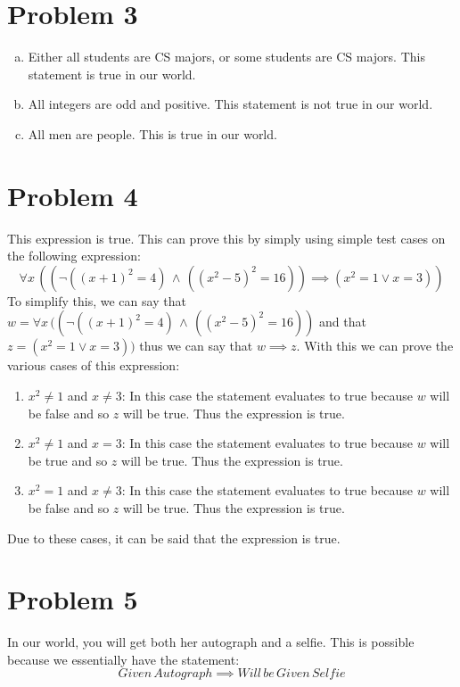 \documentclass[12pt]{article}%
\begin{document}
\section*{Problem 3}
    \begin{enumerate}[a)]
        \item Either all students are CS majors, or some students are CS majors. This statement is true in our world.
        \item All integers are odd and positive. This statement is not true in our world.
        \item All men are people. This is true in our world.
    \end{enumerate}

\section*{Problem 4}
    This expression is true. This can prove this by simply using simple test cases on the following expression:
    \[\forall x \, ((\neg((x+1)^2=4) \, \land \, ((x^2 - 5)^2 = 16)) \implies (x^2 =1 \lor x=3))\]
    To simplify this, we can say that $w=\forall x \, ((\neg((x+1)^2=4) \, \land \, ((x^2 - 5)^2 = 16))$ and that $z=(x^2 =1 \lor x=3))$ thus we can say that $w\implies z$. With this we can prove the various cases of this expression:
    \begin{enumerate}
        \item $x^2 \neq 1$ and $x \neq 3$: In this case the statement evaluates to true because $w$ will be false and so $z$ will be true. Thus the expression is true. 
        \item $x^2 \neq 1$ and $x = 3$: In this case the statement evaluates to true because $w$ will be true and so $z$ will be true. Thus the expression is true.
        \item $x^2 = 1$ and $x \neq 3$: In this case the statement evaluates to true because $w$ will be false and so $z$ will be true. Thus the expression is true.
    \end{enumerate}
    Due to these cases, it can be said that the expression is true.

\section*{Problem 5}
    In our world, you will get both her autograph and a selfie. This is possible because we essentially have the statement:
    \[ Given\, Autograph \implies Will\, be\, Given\, Selfie \]
    
\end{document}
